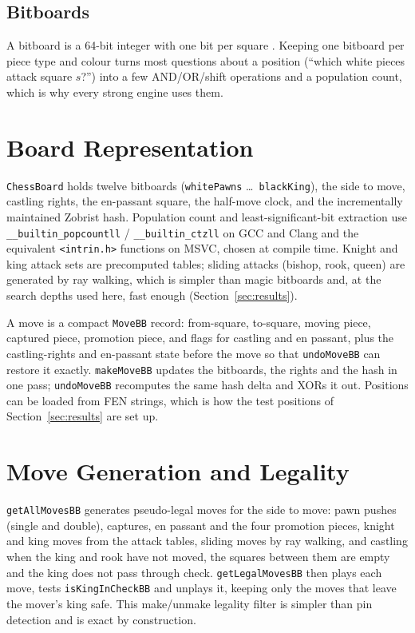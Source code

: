 \documentclass[conference]{IEEEtran}
\begin{document}
\subsection{Bitboards}
A bitboard is a 64-bit integer with one bit per square \cite{cpw}. Keeping one bitboard per piece type and colour turns most questions about a position (``which white pieces attack square $s$?'') into a few AND/OR/shift operations and a population count, which is why every strong engine uses them.

\section{Board Representation}
\texttt{ChessBoard} holds twelve bitboards (\texttt{whitePawns} \ldots\ \texttt{blackKing}), the side to move, castling rights, the en-passant square, the half-move clock, and the incrementally maintained Zobrist hash. Population count and least-significant-bit extraction use \texttt{\_\_builtin\_popcountll} / \texttt{\_\_builtin\_ctzll} on GCC and Clang and the equivalent \texttt{<intrin.h>} functions on MSVC, chosen at compile time. Knight and king attack sets are precomputed tables; sliding attacks (bishop, rook, queen) are generated by ray walking, which is simpler than magic bitboards and, at the search depths used here, fast enough (Section~\ref{sec:results}).

A move is a compact \texttt{MoveBB} record: from-square, to-square, moving piece, captured piece, promotion piece, and flags for castling and en passant, plus the castling-rights and en-passant state before the move so that \texttt{undoMoveBB} can restore it exactly. \texttt{makeMoveBB} updates the bitboards, the rights and the hash in one pass; \texttt{undoMoveBB} recomputes the same hash delta and XORs it out. Positions can be loaded from FEN strings, which is how the test positions of Section~\ref{sec:results} are set up.

\section{Move Generation and Legality}
\texttt{getAllMovesBB} generates pseudo-legal moves for the side to move: pawn pushes (single and double), captures, en passant and the four promotion pieces, knight and king moves from the attack tables, sliding moves by ray walking, and castling when the king and rook have not moved, the squares between them are empty and the king does not pass through check. \texttt{getLegalMovesBB} then plays each move, tests \texttt{isKingInCheckBB} and unplays it, keeping only the moves that leave the mover's king safe. This make/unmake legality filter is simpler than pin detection and is exact by construction.
\end{document}
